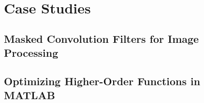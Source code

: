 \chapter{Case Studies}
\label{ch:case-studies}

\section{Masked Convolution Filters for Image Processing}
\label{se:convolution}

\section{Optimizing Higher-Order Functions in MATLAB}